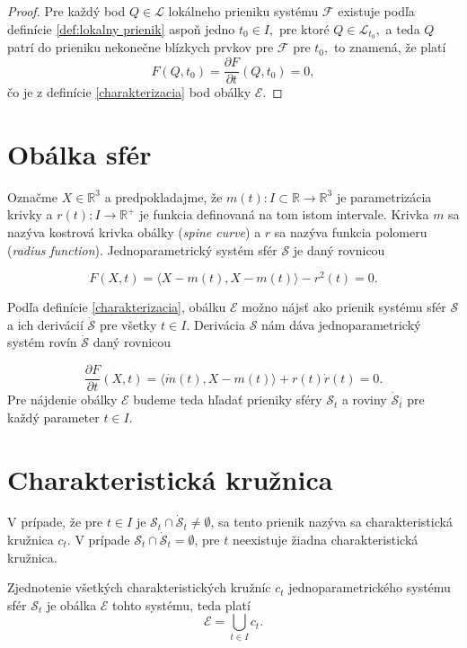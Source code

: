 \begin{proof}
Pre každý bod $Q \in \mathcal{L}$ lokálneho prieniku systému $\mathcal{F}$ existuje podľa definície \ref{def:lokalny prienik} aspoň jedno $t_0 \in I,$ pre ktoré $Q \in \mathcal{L}_{t_0}, $ a teda $Q$ patrí do prieniku nekonečne blízkych prvkov pre $\mathcal{F}$ pre $t_0,$ to znamená, že platí
$$ F(Q, t_0) = \dfrac{\partial F}{\partial t} (Q, t_0) = 0,
$$  
čo je z definície \ref{charakterizacia} bod obálky $\mathcal{E}.$
\end{proof}

\section{Obálka sfér}
Označme $X \in \mathbb{R}^3$ a predpokladajme, že $m(t) \colon I \subset \mathbb{R} \rightarrow \mathbb{R}^3$ je parametrizácia krivky a $r(t) \colon I \rightarrow \mathbb{R}^{+}$ je funkcia definovaná na tom istom intervale. Krivka $m$ sa nazýva kostrová krivka obálky (\textit{spine curve}) a $r$ sa nazýva funkcia polomeru (\textit{radius function}). Jednoparametrický systém sfér $\mathcal{S}$ je daný rovnicou

$$
F(X, t) = \langle X - m(t), X - m(t) \rangle - r^2(t)= 0.
$$

Podľa definície \ref{charakterizacia}, obálku $\mathcal{E}$ možno nájsť ako prienik systému sfér $\mathcal{S}$ a ich derivácií $\mathcal{\dot{S}}$ pre všetky $t \in I$. Derivácia $\mathcal{S}$ nám dáva jednoparametrický systém rovín $\mathcal{\dot{S}}$ daný rovnicou

$$
\dfrac{\partial F}{\partial t} (X, t) = \langle \dot{m}(t), X - m(t) \rangle + r(t) \dot{r}(t) = 0.
$$
Pre nájdenie obálky $\mathcal{E}$ budeme teda hľadať prieniky sféry $\mathcal{S}_t$ a roviny $\mathcal{\dot{S}}_t $ pre každý parameter $t \in I$.

\section{Charakteristická kružnica}
\begin{definition}
V prípade, že pre $t \in I$ je $\mathcal{S}_{t} \cap \mathcal{\dot{S}}_{t} \neq \emptyset$, sa tento prienik nazýva sa charakteristická kružnica $c_{t}$. V prípade $\mathcal{S}_{t} \cap \mathcal{\dot{S}}_{t} = \emptyset$, pre \(t\) neexistuje žiadna charakteristická kružnica.
\end{definition}

\begin{lemma} \label{lema o zjednoteni charakteristickych kruznic}
Zjednotenie všetkých charakteristických kružníc $c_{t}$ jednoparametrického systému sfér $\mathcal{S}_t$ je obálka $\mathcal{E}$ tohto systému, teda platí $$\mathcal{E} = \bigcup_{t \in I} c_{t}.$$
\end{lemma}

